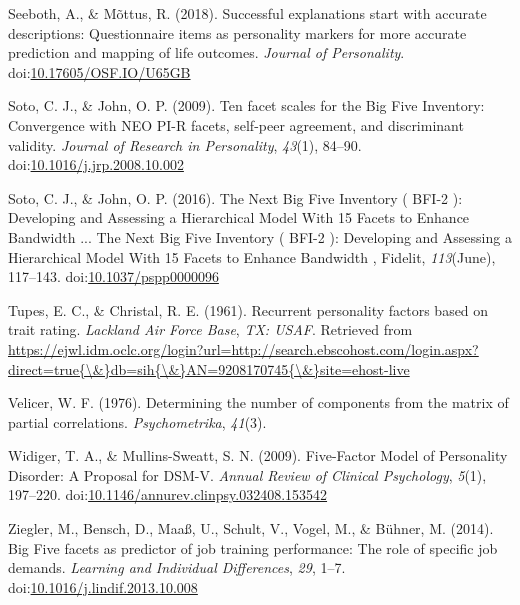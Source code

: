 \documentclass[,man,floatsintext]{apa6}
\theoremstyle{definition}
\theoremstyle{definition}
\theoremstyle{definition}
\theoremstyle{remark}
\begin{document}
\leavevmode\hypertarget{ref-Seeboth2018}{}%
Seeboth, A., \& Mõttus, R. (2018). Successful explanations start with
accurate descriptions: Questionnaire items as personality markers for
more accurate prediction and mapping of life outcomes. \emph{Journal of
Personality}.
doi:\href{https://doi.org/10.17605/OSF.IO/U65GB}{10.17605/OSF.IO/U65GB}

\leavevmode\hypertarget{ref-SotoJohn2009}{}%
Soto, C. J., \& John, O. P. (2009). Ten facet scales for the Big Five
Inventory: Convergence with NEO PI-R facets, self-peer agreement, and
discriminant validity. \emph{Journal of Research in Personality},
\emph{43}(1), 84--90.
doi:\href{https://doi.org/10.1016/j.jrp.2008.10.002}{10.1016/j.jrp.2008.10.002}

\leavevmode\hypertarget{ref-SotoJohn2016}{}%
Soto, C. J., \& John, O. P. (2016). The Next Big Five Inventory ( BFI-2
): Developing and Assessing a Hierarchical Model With 15 Facets to
Enhance Bandwidth ... The Next Big Five Inventory ( BFI-2 ): Developing
and Assessing a Hierarchical Model With 15 Facets to Enhance Bandwidth ,
Fidelit, \emph{113}(June), 117--143.
doi:\href{https://doi.org/10.1037/pspp0000096}{10.1037/pspp0000096}

\leavevmode\hypertarget{ref-TupesChristal1961}{}%
Tupes, E. C., \& Christal, R. E. (1961). Recurrent personality factors
based on trait rating. \emph{Lackland Air Force Base}, \emph{TX: USAF}.
Retrieved from
\href{https://ejwl.idm.oclc.org/login?url=http://search.ebscohost.com/login.aspx?direct=true\%7B/\&\%7Ddb=sih\%7B/\&\%7DAN=9208170745\%7B/\&\%7Dsite=ehost-live}{https://ejwl.idm.oclc.org/login?url=http://search.ebscohost.com/login.aspx?direct=true\{\textbackslash{}\&\}db=sih\{\textbackslash{}\&\}AN=9208170745\{\textbackslash{}\&\}site=ehost-live}

\leavevmode\hypertarget{ref-Velicer1976}{}%
Velicer, W. F. (1976). Determining the number of components from the
matrix of partial correlations. \emph{Psychometrika}, \emph{41}(3).

\leavevmode\hypertarget{ref-WidigerMullins2009}{}%
Widiger, T. A., \& Mullins-Sweatt, S. N. (2009). Five-Factor Model of
Personality Disorder: A Proposal for DSM-V. \emph{Annual Review of
Clinical Psychology}, \emph{5}(1), 197--220.
doi:\href{https://doi.org/10.1146/annurev.clinpsy.032408.153542}{10.1146/annurev.clinpsy.032408.153542}

\leavevmode\hypertarget{ref-Ziegler2014}{}%
Ziegler, M., Bensch, D., Maaß, U., Schult, V., Vogel, M., \& Bühner, M.
(2014). Big Five facets as predictor of job training performance: The
role of specific job demands. \emph{Learning and Individual
Differences}, \emph{29}, 1--7.
doi:\href{https://doi.org/10.1016/j.lindif.2013.10.008}{10.1016/j.lindif.2013.10.008}
\end{document}
